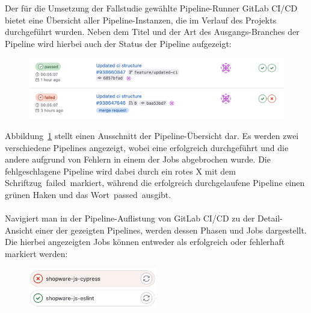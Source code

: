 Der für die Umsetzung der Fallstudie gewählte Pipeline-Runner GitLab CI/CD bietet eine Übersicht aller
Pipeline-Instanzen, die im Verlauf des Projekts durchgeführt wurden.
Neben dem Titel und der Art des Ausgangs-Branches der Pipeline wird hierbei auch der Status der Pipeline aufgezeigt:

\begin{figure}[H]
    \centering
    \includegraphics[width=\textwidth]{images/content/pipeline-overview}
    \label{fig:pipeline-overview}
\end{figure}

Abbildung\ \ref{fig:pipeline-overview} stellt einen Ausschnitt der Pipeline-Übersicht dar.
Es werden zwei verschiedene Pipelines angezeigt, wobei eine erfolgreich durchgeführt und die andere
aufgrund von Fehlern in einem der Jobs abgebrochen wurde.
Die fehlgeschlagene Pipeline wird dabei durch ein rotes X mit dem Schriftzug\ \glqq failed\grqq\ markiert, während die
erfolgreich durchgelaufene Pipeline einen grünen Haken und das Wort\ \glqq passed\grqq\ ausgibt.
\\\\
Navigiert man in der Pipeline-Auflistung von GitLab CI/CD zu der Detail-Ansicht einer der gezeigten Pipelines, werden
dessen Phasen und Jobs dargestellt.
Die hierbei angezeigten Jobs können entweder als erfolgreich oder fehlerhaft markiert werden:

\begin{figure}[H]
    \centering
    \includegraphics[width=0.5\textwidth]{images/content/job-status}
    \label{fig:job-status}
\end{figure}

